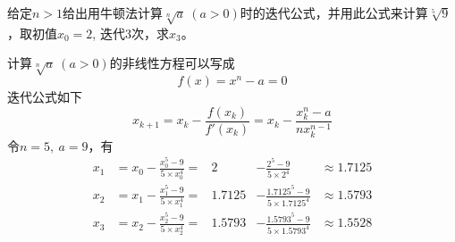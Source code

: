\documentclass[11pt]{article}
\begin{document}
\maketitle

\thispagestyle{empty}

\newpage

\begin{question}

    \questiontext
    {
        给定$n > 1$给出用牛顿法计算$\sqrt[n]{a}\ (a > 0)$时的迭代公式，并用此公式来计算$\sqrt[5]{9}$，取初值$x_0 = 2$, 迭代3次，求$x_3$。
    }

    \answer
    {
        计算$\sqrt[n]{a}\ (a > 0)$的非线性方程可以写成
        \begin{equation*}
            f(x) = x^n - a = 0
        \end{equation*}
        迭代公式如下
        \begin{equation*}
            x_{k+1} = x_k - \frac{f(x_k)}{f'(x_k)} = x_k - \frac{x_k^n - a}{nx_k^{n - 1}}
        \end{equation*}
        令$n = 5,\ a = 9$，有
        \begin{align*}
            x_1 & = x_0 - \frac{x_0^5 - 9}{5 \times x_0^4} = & 2      & - \frac{2^5 - 9}{5 \times 2^4}           & \approx 1.7125 \\
            x_2 & = x_1 - \frac{x_1^5 - 9}{5 \times x_1^4} = & 1.7125 & - \frac{1.7125^5 - 9}{5 \times 1.7125^4} & \approx 1.5793 \\
            x_3 & = x_2 - \frac{x_2^5 - 9}{5 \times x_2^4} = & 1.5793 & - \frac{1.5793^5 - 9}{5 \times 1.5793^4} & \approx 1.5528
        \end{align*}
    }

\end{question}
\end{document}
